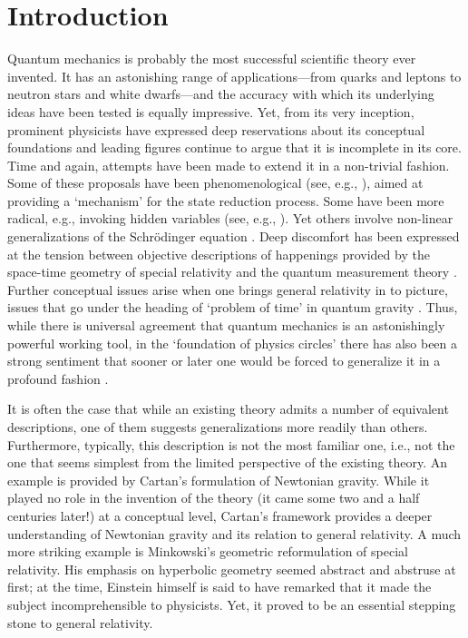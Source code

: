 \documentclass[12pt,aps,eqsecnum,tighten,nofootinbib]{revtex4-2}
\begin{document}
\newpage

\section{Introduction}\label{sec1}

Quantum mechanics is probably the most successful scientific theory
ever invented. It has an astonishing range of applications---from
quarks and leptons to neutron stars and white dwarfs---and the
accuracy with which its underlying ideas have been tested is equally
impressive. Yet, from its very inception, prominent physicists have
expressed deep reservations about its conceptual foundations and
leading figures continue to argue that it is incomplete in its
core. Time and again, attempts have been made to extend it in a
non-trivial fashion. Some of these proposals have been
phenomenological (see, e.g., \cite{grw,pearle1,ggr}), aimed at
providing a `mechanism' for the state reduction process. Some have
been more radical, e.g., invoking hidden variables (see, e.g.,
\cite{jb1}). Yet others involve non-linear generalizations of the
Schr\"odinger equation \cite{birula,pearle2,weinberg}. Deep discomfort
has been expressed at the tension between objective descriptions of
happenings provided by the space-time geometry of special relativity
and the quantum measurement theory \cite{pearle3,jb2}. Further
conceptual issues arise when one brings general relativity in to
picture, issues that go under the heading of `problem of time' in
quantum gravity \cite{as,kk,ci1}. Thus, while there is universal
agreement that quantum mechanics is an astonishingly powerful working
tool, in the `foundation of physics circles' there has also been a
strong sentiment that sooner or later one would be forced to
generalize it in a profound fashion \cite{rp1,gh,ci2}.

It is often the case that while an existing theory admits a number of
equivalent descriptions, one of them suggests generalizations more
readily than others. Furthermore, typically, this description is not
the most familiar one, i.e., not the one that seems simplest from the
limited perspective of the existing theory. An example is provided by
Cartan's formulation of Newtonian gravity. While it played no role in
the invention of the theory (it came some two and a half centuries
later!) at a conceptual level, Cartan's framework provides a deeper
understanding of Newtonian gravity and its relation to general
relativity. A much more striking example is Minkowski's geometric
reformulation of special relativity.  His emphasis on hyperbolic
geometry seemed abstract and abstruse at first; at the time, Einstein
himself is said to have remarked that it made the subject
incomprehensible to physicists. Yet, it proved to be an essential
stepping stone to general relativity.
\end{document}
